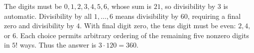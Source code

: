 The digits must be $0,1,2,3,4,5,6$, whose sum is $21$, so divisibility by $3$ is automatic. Divisibility by all $1,\ldots,6$ means divisibility by $60$, requiring a final zero and divisibility by $4$. With final digit zero, the tens digit must be even: $2,4,$ or $6$. Each choice permits arbitrary ordering of the remaining five nonzero digits in $5!$ ways. Thus the answer is $3\cdot 120=\boxed{360}$.
